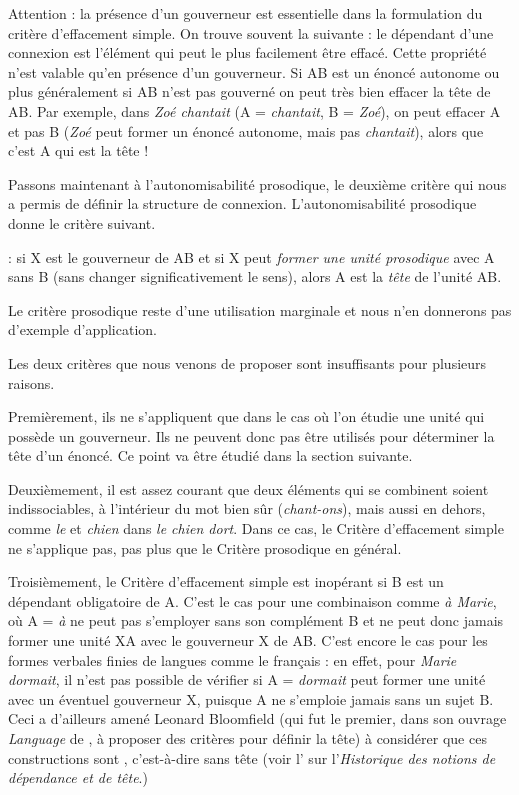 Attention : la présence d’un gouverneur est essentielle dans la formulation du  critère d’effacement simple. On trouve souvent la  suivante : le dépendant d’une connexion est l’élément qui peut le plus facilement être effacé. Cette propriété n’est valable qu’en présence d’un gouverneur. Si AB est un énoncé autonome ou plus généralement si AB n’est pas gouverné on peut très bien effacer la tête de AB. Par exemple, dans \textit{Zoé chantait} (A = \textit{chantait}, B = \textit{Zoé}), on peut effacer A et pas B (\textit{Zoé} peut former un énoncé autonome, mais pas \textit{chantait}), alors que c’est A qui est la tête !

Passons maintenant à l’autonomisabilité prosodique, le deuxième critère qui nous a permis de définir la structure de connexion. L’autonomisabilité prosodique donne le critère suivant.

{ : si X est le gouverneur de AB et si X {peut \textit{former une unité prosodique} avec} A sans B (sans changer significativement le sens), alors A est {la \textit{tête} de l’unité} AB.}

Le critère prosodique reste d'une utilisation marginale et nous n'en donnerons pas d'exemple d'application.

Les deux critères que nous venons de proposer sont insuffisants pour plusieurs raisons.

Premièrement, ils ne s’appliquent que dans le cas où l’on étudie une unité qui possède un gouverneur. Ils ne peuvent donc pas être utilisés pour déterminer la tête d’un énoncé. Ce point va être étudié dans la section suivante.

Deuxièmement, il est assez courant que deux éléments qui se combinent soient indissociables, à l’intérieur du mot bien sûr (\textit{chant-ons}), mais aussi en dehors, comme \textit{le} et \textit{chien} dans \textit{le chien dort}. Dans ce cas, le Critère d’effacement simple ne s’applique pas, pas plus que le Critère prosodique en général.

Troisièmement, le Critère d’effacement simple est inopérant si B est un dépendant obligatoire de A. C’est le cas pour une combinaison comme \textit{à Marie}, où A = \textit{à} ne peut pas s’employer sans son complément B et ne peut donc jamais former une unité XA avec le gouverneur X de AB. C’est encore le cas pour les formes verbales finies de langues comme le français : en effet, pour \textit{Marie dormait}, il n’est pas possible de vérifier si A = \textit{dormait} peut former une unité avec un éventuel gouverneur X, puisque A ne s’emploie jamais sans un sujet B. Ceci a d’ailleurs amené Leonard Bloomfield (qui fut le premier, dans son ouvrage \textit{Language} de \citeyear{bloomfield1933language}, à proposer des critères pour définir la tête) à considérer que ces constructions sont , c’est-à-dire sans tête (voir l' sur l'\textit{Historique des notions de dépendance et de tête}.)

